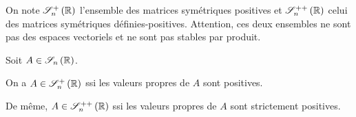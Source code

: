On note \(\sympos{n}[\R]\) l'ensemble des matrices symétriques positives et \(\symdefpos{n}[\R]\) celui des matrices symétriques définies-positives. Attention, ces deux ensembles ne sont pas des espaces vectoriels et ne sont pas stables par produit.

\begin{prop}
Soit \(A\in\sym{n}[\R]\).

On a \(A\in\sympos{n}[\R]\) ssi les valeurs propres de \(A\) sont positives.

De même, \(A\in\symdefpos{n}[\R]\) ssi les valeurs propres de \(A\) sont strictement positives.
\end{prop}

